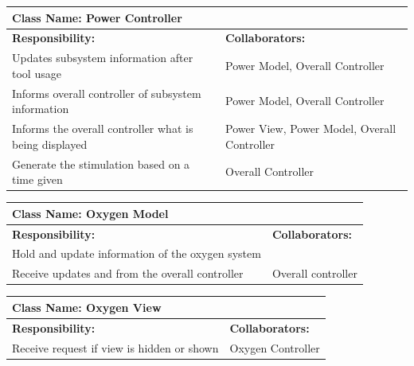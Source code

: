 \documentclass[12pt, titlepage]{article}
\begin{document}
	\begin{table}[H]
		\centering
		\begin{tabular}{|p{10cm}|p{5cm}|}
		\hline 
		 \multicolumn{2}{|l|}{\textbf{Class Name: Power Controller}} \\
		\hline
		\textbf{Responsibility:} & \textbf{Collaborators:} \\
		\hline
		Updates subsystem information after tool usage & Power Model, Overall Controller\\
		\hline
		 Informs overall controller of subsystem information & Power Model, Overall Controller\\
		\hline
		 Informs the overall controller what is being displayed & Power View, Power Model, Overall Controller\\
		\hline
		 Generate the stimulation based on a time given & Overall Controller \\
		\hline
		\end{tabular}
	\end{table}

	\begin{table}[H]
		\centering
		\begin{tabular}{|p{10cm}|p{5cm}|}
		\hline 
		 \multicolumn{2}{|l|}{\textbf{Class Name: Oxygen Model}} \\
		\hline
		\textbf{Responsibility:} & \textbf{Collaborators:} \\
		\hline
		 Hold and update information of the oxygen system & \\
		\hline
		Receive updates and from the overall controller & Overall controller \\
		\hline
		\end{tabular}
	\end{table}

	\begin{table}[H]
		\centering
		\begin{tabular}{|p{10cm}|p{5cm}|}
		\hline 
		 \multicolumn{2}{|l|}{\textbf{Class Name: Oxygen View}} \\
		\hline
		\textbf{Responsibility:} & \textbf{Collaborators:} \\
		\hline 
		 Receive request if view is hidden or shown & Oxygen Controller\\
		\hline
		\end{tabular}
	\end{table}
\end{document}
